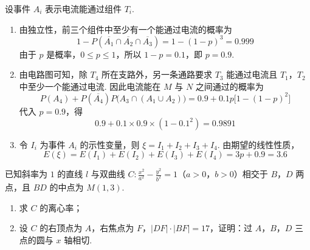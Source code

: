 \begin{solution}
设事件 \(A_i\) 表示电流能通过组件 \(T_i\).

\begin{enumerate}
\item 由独立性，前三个组件中至少有一个能通过电流的概率为
\[
1-P\left(\overline{A_1}\cap\overline{A_2}\cap\overline{A_3}\right)=1-(1-p)^3=0.999
\]
由于 \(p\) 是概率，\(0\leqslant p\leqslant1\)，所以 \(1-p=0.1\)，即 \(p=0.9\).

\item 由电路图可知，除 \(T_4\) 所在支路外，另一条通路要求 \(T_3\) 能通过电流且 \(T_1\)，\(T_2\) 中至少一个能通过电流. 因此电流能在 \(M\) 与 \(N\) 之间通过的概率为
\[
P(A_4)+P(\overline{A_4})P\bigl(A_3\cap(A_1\cup A_2)\bigr)=0.9+0.1p\bigl[1-(1-p)^2\bigr]
\]
代入 \(p=0.9\)，得
\[
0.9+0.1\times0.9\times(1-0.1^2)=0.9891
\]

\item 令 \(I_i\) 为事件 \(A_i\) 的示性变量，则 \(\xi=I_1+I_2+I_3+I_4\). 由期望的线性性质，
\[
E(\xi)=E(I_1)+E(I_2)+E(I_3)+E(I_4)=3p+0.9=3.6
\]
\end{enumerate}
\end{solution}

\begin{problem}
已知斜率为 \(1\) 的直线 \(l\) 与双曲线 \(C: \frac{x^{2}}{a^{2}} - \frac{y^{2}}{b^{2}} = 1\)（\(a > 0\)，\(b > 0\)）相交于 \(B\)，\(D\) 两点，且 \(BD\) 的中点为 \(M(1,3)\).
\begin{enumerate}
\item 求 \(C\) 的离心率；
\item 设 \(C\) 的右顶点为 \(A\)，右焦点为 \(F\)，\(|DF| \cdot |BF| = 17\)，证明：过 \(A\)，\(B\)，\(D\) 三点的圆与 \(x\) 轴相切.
\end{enumerate}
\end{problem}

